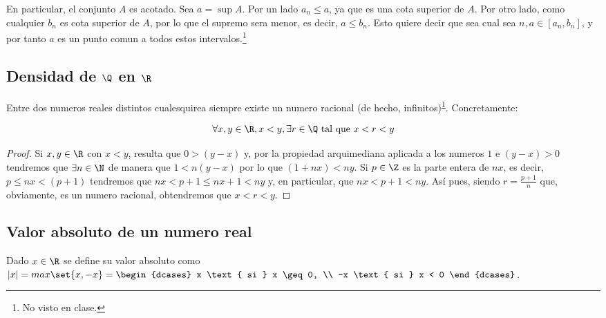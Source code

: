 En particular, el conjunto \(A \) es acotado. Sea \(a = \sup A \). Por un lado \(a_n \leq a \), ya que es una cota superior de \(A \). Por otro lado, como cualquier \(b_n \) es cota superior de \(A \), por lo que el supremo sera menor, es decir, \(a \leq b_n \). Esto quiere decir que sea cual sea \(n,a \in [a_n,b_n ]\), y por tanto \(a \) es un punto comun a todos estos intervalos.\footnote{\label{novisto}No visto en clase.}

\subsection{Densidad de \(\Q\) en \(\R \)}
Entre dos numeros reales distintos cualesquirea siempre existe un numero racional (de hecho, infinitos)\textsuperscript{\ref{novisto}}. Concretamente:
\begin{proposition}
	\[
		\forall x,y \in \R, x < y, \exists r \in \Q \text{ tal que } x < r < y
	\]
\end{proposition}
\begin{proof}
	Si \(x,y \in \R \) con \(x < y \), resulta que \(0 > (y-x) \) y, por la propiedad arquimediana aplicada a los numeros \(1\) e \((y-x) > 0 \) tendremos que \(\exists n \in \N \) de manera que \(1 < n(y - x )\) por lo que \((1 + nx) < ny \). Si \(p \in \Z \) es la parte entera de \(nx \), es decir, \(p \leq nx < (p + 1)\) tendremos que \(nx < p + 1 \leq nx + 1 < ny \) y, en particular, que \(nx < p + 1 < ny \). Así pues, siendo \(r = \frac{p + 1 }{n }\) que, obviamente, es un numero racional, obtendremos que \(x < r < y \).
\end{proof}
\subsection{Valor absoluto de un numero real}
Dado \(x \in \R \) se define su valor absoluto como \(|x| = max\set{x,-x} = \begin{dcases}
	x \text{ si } x \geq 0, \\
	-x \text{ si } x < 0
\end{dcases}\).


